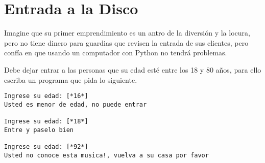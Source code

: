 \section{Entrada a la Disco}

Imagine que su primer emprendimiento es un antro de la diversión y la locura, pero no tiene dinero para guardias que revisen la entrada de sus clientes, pero confía en que usando un computador con Python no tendrá problemas.

Debe dejar entrar a las personas que su edad esté entre los 18 y 80 años, para ello escriba un programa que pida lo siguiente.

\begin{lstlisting}[style=consola]
Ingrese su edad: [*16*]
Usted es menor de edad, no puede entrar

Ingrese su edad: [*18*]
Entre y paselo bien

Ingrese su edad: [*92*]
Usted no conoce esta musica!, vuelva a su casa por favor
\end{lstlisting}
